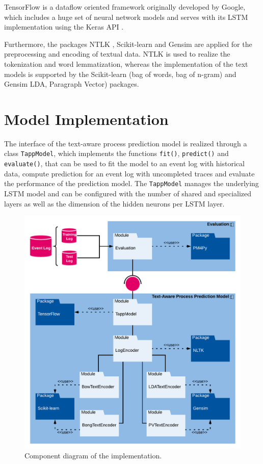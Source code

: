 TensorFlow \cite{DBLP:journals/corr/AbadiABBCCCDDDG16} is a dataflow oriented framework originally developed by Google, which includes a huge set of neural network models and serves with its LSTM implementation using the Keras API \cite{chollet2015keras}.

Furthermore, the packages NTLK \cite{DBLP:books/daglib/0022921}, Scikit-learn \cite{DBLP:journals/jmlr/PedregosaVGMTGBPWDVPCBPD11} and Gensim \cite{rehurek_lrec} are applied for the preprocessing and encoding of textual data.
NTLK is used to realize the tokenization and word lemmatization, whereas the implementation of the text models is supported by the Scikit-learn (bag of words, bag of n-gram) and Gensim LDA, Paragraph Vector) packages.


\section{Model Implementation}

The interface of the text-aware process prediction model is realized through a class \texttt{TappModel}, which implements the functions \texttt{fit()},  \texttt{predict()} and  \texttt{evaluate()}, that can be used to fit the model to an event log with historical data, compute prediction for an event log with uncompleted traces and evaluate the performance of the prediction model.
The \texttt{TappModel} manages the underlying LSTM model and can be configured with the number of shared and specialized layers as well as the dimension of the hidden neurons per LSTM layer.

\begin{figure}[htbp!]
	\centering
	\includegraphics[width=\textwidth]{figures/implementation}
	\caption[Component diagram of the implementation]{Component diagram of the implementation.}
	\label{fig:/implementation}
\end{figure}

